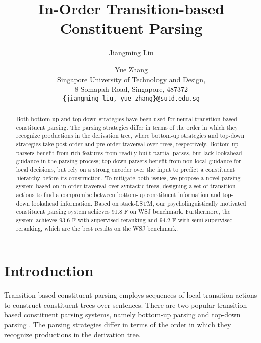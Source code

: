 \documentclass[11pt,letterpaper]{article}
\title{In-Order Transition-based Constituent Parsing}
\author{Jiangming Liu \and Yue Zhang\\
	    Singapore University of Technology and Design,\\
	    8 Somapah Road, Singapore, 487372\\
	    {\tt \{jiangming\_liu, yue\_zhang\}@sutd.edu.sg}}
\date{}
\begin{document}
\maketitle
\begin{abstract}
Both bottom-up and top-down strategies have been used for neural transition-based constituent parsing.
The parsing strategies differ in terms of the order in which they recognize productions in the derivation tree, where bottom-up strategies and top-down strategies take post-order and pre-order traversal over trees, respectively.
Bottom-up parsers benefit from rich features from readily built partial parses, but lack lookahead guidance in the parsing process; top-down parsers benefit from non-local guidance for local decisions, but rely on a strong encoder over the input to predict a constituent hierarchy before its construction.
To mitigate both issues, we propose a novel parsing system based on in-order traversal over syntactic trees, designing a set of transition actions to find a compromise between bottom-up constituent information and top-down lookahead information.
Based on stack-LSTM, our psycholinguistically motivated constituent parsing system achieves 91.8 F on WSJ benchmark.
Furthermore, the system achieves 93.6 F with supervised reranking and 94.2 F with semi-supervised reranking, which are the best results on the WSJ benchmark.
\end{abstract}

\section{Introduction}
Transition-based constituent parsing employs sequences of local transition actions to construct constituent trees over sentences.
There are two popular transition-based constituent parsing systems, namely bottom-up parsing \cite{sagae:2005,zhang:2009,zhu:2013,watanabe:2015} and top-down parsing \cite{dyer:2016,kuncoro:2017}.
The parsing strategies differ in terms of the order in which they recognize productions in the derivation tree.
\end{document}
